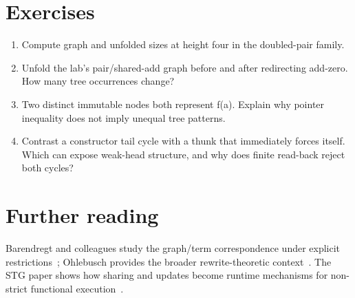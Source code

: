 \section{Exercises}
\label{sec:ch86-exercises}
\begin{enumerate}
\item\label{ex:ch86-unfold} Compute graph and unfolded sizes at height four in the doubled-pair family.
\item\label{ex:ch86-update} Unfold the lab's pair/shared-add graph before and after redirecting add-zero.
How many tree occurrences change?
\item\label{ex:ch86-identity} Two distinct immutable nodes both represent f(a).
Explain why pointer inequality does not imply unequal tree patterns.
\item\label{ex:ch86-cycle} Contrast a constructor tail cycle with a thunk that immediately forces itself.
Which can expose weak-head structure, and why does finite read-back reject both cycles?
\end{enumerate}

\section{Further reading}
\label{sec:ch86-reading}
Barendregt and colleagues study the graph/term correspondence under explicit restrictions~\cite{barendregt-1987-term-graphs}; Ohlebusch provides the broader rewrite-theoretic context~\cite{ohlebusch-2002-rewriting}.
The STG paper shows how sharing and updates become runtime mechanisms for non-strict functional execution~\cite{peytonjones-1992-stg}.
